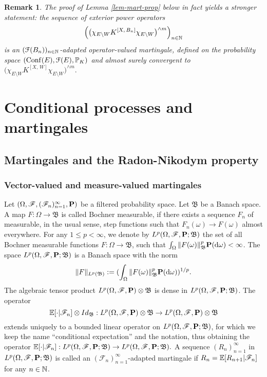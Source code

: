 \documentclass[12pt]{paper}
\newtheorem*{remark*}{Remark}
\numberwithin{theorem}{section}
\numberwithin{figure}{section}
\numberwithin{equation}{section}
\begin{document}
\begin{remark*}
The proof of Lemma \ref{lem-mart-prop} below in fact yields a stronger statement:  the sequence of exterior power operators
\[
\Big( \big( \chi_{E\setminus W}  K^{[X, \, B_n]} \chi_{E\setminus W}\big)^{\wedge m}  \Big)_{n\in \mathbb{N}}
\]
is an $(\mathcal{F}(B_n))_{n\in\mathbb{N}}$-adapted operator-valued martingale, defined on the probability space $(\mathrm{Conf}(E), \mathcal{F}(E), \mathbb{P}_K)$ and  almost surely convergent to
$
\big( \chi_{E\setminus W}  K^{[X, \, W]} \chi_{E\setminus W}\big)^{\wedge m}.
$
\end{remark*}


\section{Conditional processes and martingales}\label{sec-preliminaries}

\subsection{Martingales and the Radon-Nikodym property}\label{sec-conv-mart}
\subsubsection{Vector-valued and measure-valued martingales}

Let $(\Omega, \mathscr{F}, (\mathscr{F}_n)_{n=1}^\infty, \bold{P})$ be a filtered probability space. Let $\mathfrak{B}$ be a Banach space.  A map $F: \Omega\rightarrow \mathfrak{B}$ is called  Bochner measurable, if there exists a sequence $F_n$ of measurable, in the usual sense, step functions such that $F_n(\omega) \to F(\omega)$ almost everywhere. For any $1\le p < \infty$, we denote by $L^p(\Omega, \mathscr{F}, \bold{P}; \mathfrak{B})$ the set of all Bochner measurable functions $F: \Omega \rightarrow \mathfrak{B}$, such that $\int_\Omega \| F(\omega)\|_{\mathfrak{B}}^p \bold{P}(\mathrm{d} \omega) < \infty$.  The space  $L^p(\Omega, \mathscr{F}, \bold{P}; \mathfrak{B})$ is a Banach space with the norm
 \[
 \|F\|_{L^p(\mathfrak{B})}: =  (\int_\Omega \| F(\omega)\|_{\mathfrak{B}}^p \bold{P}(\mathrm{d} \omega))^{1/p}.
 \]
The algebraic tensor product $L^p(\Omega, \mathscr{F}, \bold{P}) \otimes \mathfrak{B}$ is dense in  $L^p(\Omega, \mathscr{F},\bold{P}; \mathfrak{B})$.  The operator
  \[
  \mathbb{E}[\cdot | \mathscr{F}_n] \otimes Id_{\mathfrak{B}} :  L^p(\Omega, \mathscr{F}, \bold{P}) \otimes \mathfrak{B} \rightarrow L^p(\Omega, \mathscr{F}, \bold{P}) \otimes \mathfrak{B}
  \]
  extends uniquely to a bounded linear operator on $L^p(\Omega, \mathscr{F}, \bold{P};  \mathfrak{B})$, for which we keep the name ``conditional expectation''  and the notation, thus obtaining the operator  $  \mathbb{E}[\cdot | \mathscr{F}_n]:  L^p(\Omega, \mathscr{F}, \bold{P}; \mathfrak{B}) \rightarrow L^p(\Omega, \mathscr{F}, \bold{P};\mathfrak{B}).
$
A sequence $(R_n)_{n=1}^\infty$ in $L^p(\Omega, \mathscr{F}, \bold{P}; \mathfrak{B})$ is called an $(\mathscr{F}_n)_{n=1}^\infty$-adapted martingale if $R_n = \mathbb{E}[R_{n+1} | \mathscr{F}_n]$ for any $n\in \mathbb{N}$.
\end{document}
